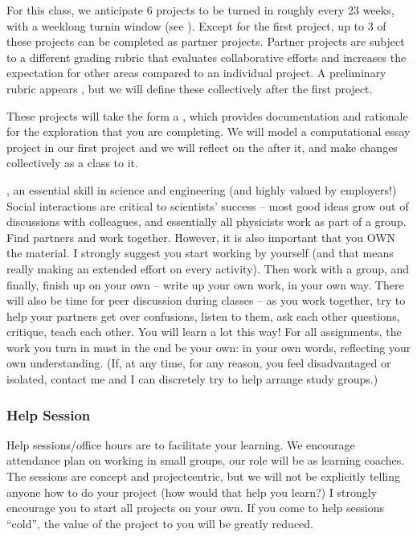 \documentclass[letterpaper,10pt,english]{jupyterBook}
\begin{document}
\sphinxAtStartPar
{} For this class, we anticipate 6 projects to be turned in roughly every 2\sphinxhyphen{}3 weeks, with a weeklong turn\sphinxhyphen{}in window (see {\hyperref[\detokenize{content/0_course/calendar::doc}]{}}). Except for the first project, up to 3 of these projects can be completed as partner projects. Partner projects are subject to a different grading rubric that evaluates collaborative efforts and increases the expectation for other areas compared to an individual project. A preliminary rubric appears {\hyperref[\detokenize{content/0_course/rubric::doc}]{}}, but we will define these collectively after the first project.

\sphinxAtStartPar
These projects will take the form a , which provides documentation and rationale for the exploration that you are completing. We will model a computational essay project in our first project and we will reflect on the {\hyperref[\detokenize{content/0_course/rubric::doc}]{}} after it, and make changes collectively as a class to it.

\sphinxAtStartPar
{}, an essential skill in science and engineering (and highly valued by employers!) Social interactions are critical to scientists’ success – most good ideas grow out of discussions with colleagues, and essentially all physicists work as part of a group. Find partners and work together. However, it is also important that you OWN the material. I strongly suggest you start working by yourself (and that means really making an extended effort on every activity). Then work with a group, and finally, finish up on your own – write up your own work, in your own way. There will also be time for peer discussion during classes – as you work together, try to help your partners get over confusions, listen to them, ask each other questions, critique, teach each other. You will learn a lot this way! For all assignments, the work you turn in must in the end be your own: in your own words, reflecting your own understanding. (If, at any time, for any reason, you feel disadvantaged or isolated, contact me and I can discretely try to help arrange study groups.)


\subsubsection{Help Session}
\label{\detokenize{content/0_course/design:help-session}}
\sphinxAtStartPar
Help sessions/office hours are to facilitate your learning. We encourage attendance \sphinxhyphen{} plan on working in small groups, our role will be as learning coaches. The sessions are concept and project\sphinxhyphen{}centric, but we will not be explicitly telling anyone how to do your project (how would that help you learn?) I strongly encourage you to start all projects on your own. If you come to help sessions “cold”, the value of the project to you will be greatly reduced.
\end{document}
